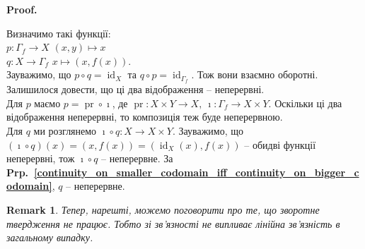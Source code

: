 \documentclass[a4paper, 10pt]{article}
\makeatletter
\theoremstyle{theoremdd}
\newtheorem{remark}[theorem]{Remark}
\newcommand\prpref[1]{\textbf{Prp.~\ref{#1}}}
\DeclareMathOperator{\id}{id}
\DeclareMathOperator{\pr}{pr}
\renewenvironment{proof}[1][Proof.\\]{\par
\pushQED{\hfill \qed}%
\normalfont \topsep6\p@\@plus6\p@\relax
\trivlist
\item\relax
{\bfseries
#1\@addpunct{.}}\hspace\labelsep\ignorespaces
}{%
\popQED\endtrivlist\@endpefalse
}
\makeatother
\begin{document}
\begin{proof}
Визначимо такі функції:\\
$p \colon \Gamma_f \to X$ \qquad $(x,y) \mapsto x$ \\
$q \colon X \to \Gamma_f$ \qquad $x \mapsto (x,f(x))$.\\
Зауважимо, що $p \circ q = \id_X$ та $q \circ p = \id_{\Gamma_f}$. Тож вони взаємно оборотні. Залишилося довести, що ці два відображення -- неперервні.\\
Для $p$ маємо $p = \pr \circ \imath$, де $\pr \colon X \times Y \to X,\ \imath \colon \Gamma_f \to X \times Y$. Оскільки ці два відображення неперервні, то композиція теж буде неперервною.\\
Для $q$ ми розглянемо $\imath \circ q \colon X \to X \times Y$. Зауважимо, що $(\imath \circ q)(x) = (x,f(x)) = (\id_X(x),f(x))$ -- обидві функції неперервні, тож $\imath \circ q$ -- неперервне. За \prpref{continuity_on_smaller_codomain_iff_continuity_on_bigger_codomain}, $q$ -- неперервне.
\end{proof}

\begin{remark}
Тепер, нарешті, можемо поговорити про те, що зворотне твердження не працює. Тобто зі зв'язності не випливає лінійна зв'язність в загальному випадку.
\end{remark}
\end{document}

